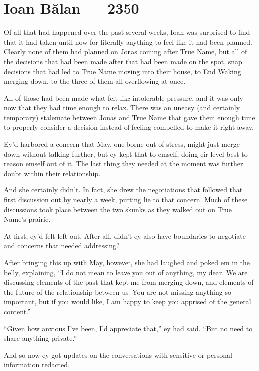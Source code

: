 \hypertarget{ioan-bux103lan-2350}{%
\chapter{Ioan Bălan — 2350}\label{ioan-bux103lan-2350}}

Of all that had happened over the past several weeks, Ioan was surprised to find that it had taken until now for literally anything to feel like it had been planned. Clearly none of them had planned on Jonas coming after True Name, but all of the decisions that had been made after that had been made on the spot, snap decisions that had led to True Name moving into their house, to End Waking merging down, to the three of them all overflowing at once.

All of those had been made what felt like intolerable pressure, and it was only now that they had time enough to relax. There was an uneasy (and certainly temporary) stalemate between Jonas and True Name that gave them enough time to properly consider a decision instead of feeling compelled to make it right away.

Ey'd harbored a concern that May, one borne out of stress, might just merge down without talking further, but ey kept that to emself, doing eir level best to reason emself out of it. The last thing they needed at the moment was further doubt within their relationship.

And she certainly didn't. In fact, she drew the negotiations that followed that first discussion out by nearly a week, putting lie to that concern. Much of these discussions took place between the two skunks as they walked out on True Name's prairie.

At first, ey'd felt left out. After all, didn't ey also have boundaries to negotiate and concerns that needed addressing?

After bringing this up with May, however, she had laughed and poked em in the belly, explaining, ``I do not mean to leave you out of anything, my dear. We are discussing elements of the past that kept me from merging down, and elements of the future of the relationship between us. You are not missing anything so important, but if you would like, I am happy to keep you apprised of the general content.''

``Given how anxious I've been, I'd appreciate that,'' ey had said. ``But no need to share anything private.''

And so now ey got updates on the conversations with sensitive or personal information redacted.

